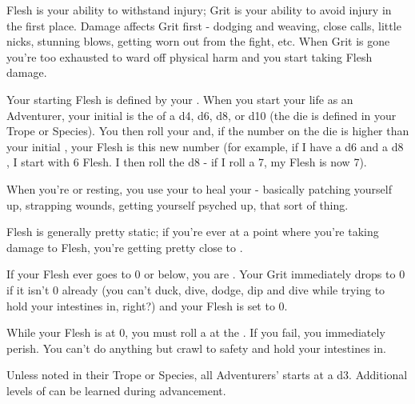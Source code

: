 {Flesh is your ability to withstand injury; Grit is your ability to avoid injury in the first place.  Damage affects Grit first - dodging and weaving, close calls, little nicks, stunning blows, getting worn out from the fight, etc. When Grit is gone you're too exhausted to ward off physical harm and you start taking Flesh damage.

Your starting Flesh is defined by your \FLESH.  When you start your life as an Adventurer, your initial \FLESH is the \MAX of a d4, d6, d8, or d10 (the die is defined in your Trope or Species). You then roll your \VIG and, if the number on the die is higher than your initial \FLESH, your \MAX Flesh is this new number (for example, if I have a d6 \FLESH and a d8 \VIG, I start with 6 Flesh.  I then roll the d8 - if I roll a 7, my \MAX Flesh is now 7).

When you're  or resting, you use your \FLESH to heal your  - basically patching yourself up, strapping wounds, getting yourself psyched up, that sort of thing.  

Flesh is generally pretty static; if you're ever at a point where you're taking damage to Flesh, you're getting pretty close to .





  If your Flesh ever goes to 0 or below, you are .  Your Grit immediately drops to 0 if it isn't 0 already (you can't duck, dive, dodge, dip and dive while trying to hold your intestines in, right?) and your Flesh is set to 0.

  While your Flesh is at 0, you must roll a \DEATH at the .  If you fail, you immediately perish.  You can't do anything but crawl to safety and hold your intestines in.

  Unless noted in their Trope or Species, all Adventurers' \DEATH starts at a d3.  Additional levels of \DEATH can be learned during advancement.



}
